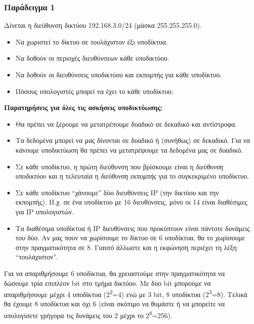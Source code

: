 \subsubsection*{Παράδειγμα 1}
Δίνεται η διεύθυνση δικτύου 192.168.3.0/24 (μάσκα 255.255.255.0).

\begin{itemize}
\item Να χωριστεί το δίκτυο σε τουλάχιστον έξι υποδίκτυα.
\item Να δοθούν οι περιοχές διευθύνσεων κάθε υποδικτύου.
\item Να δοθούν οι διευθύνσεις υποδικτύου και εκπομπής για κάθε υποδίκτυο.
\item Πόσους υπολογιστές μπορεί να έχει το κάθε υποδίκτυο;
\end{itemize}

\begin{inthebox}
\textbf{Παρατηρήσεις για όλες τις ασκήσεις υποδικτύωσης:}

\begin{itemize}
\item Θα πρέπει να ξέρουμε να μετατρέπουμε δυαδικό σε δεκαδικό και αντίστροφα.
\item Τα δεδομένα μπορεί να μας δίνονται σε δυαδικό ή (συνήθως) σε δεκαδικό. Για να κάνουμε υποδικτύωση θα πρέπει να μετατρέψουμε τα δεδομένα μας σε δυαδικό.
\item Σε κάθε υποδίκτυο, η πρώτη διεύθυνση που βρίσκουμε είναι η \emph{διεύθυνση υποδικτύου} και η τελευταία η \emph{διεύθυνση εκπομπής} για το συγκεκριμένο υποδίκτυο.
\item Σε κάθε υποδίκτυο ``χάνουμε'' δύο διευθύνσεις IP (την δικτύου και την εκπομπής). Π.χ. σε ένα υποδίκτυο με 16 διευθύνσεις, μόνο οι 14 είναι διαθέσιμες για IP υπολογιστών.
\item Τα διαθέσιμα υποδίκτυα ή IP διευθύνσεις που προκύπτουν είναι πάντοτε δυνάμεις του δύο. Αν μας πουν να χωρίσουμε το δίκτυο σε 6 υποδίκτυα, θα το χωρίσουμε στην πραγματικότητα σε 8. Γιαυτό άλλωστε και η εκφώνηση περιέχει τη λέξη ``τουλάχιστον''.
\end{itemize}
\end{inthebox}

Για να απαριθμήσουμε 6 υποδίκτυα, θα χρειαστούμε στην πραγματικότητα να δώσουμε τρία επιπλέον bit στο τμήμα δικτύου. Με δύο bit μπορούμε να απαριθμήσουμε μέχρι 4 υποδίκτυα (2\textsuperscript{2}=4) ενώ με 3 bit, 8 υποδίκτυα (2\textsuperscript{3}=8). Τελικά θα έχουμε 8 υποδίκτυα και όχι 6 (είναι σκόπιμο να θυμάστε ή να μπορείτε να υπολογίσετε γρήγορα τις δυνάμεις του 2 μέχρι το 2\textsuperscript{8}=256).

